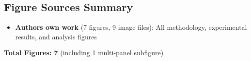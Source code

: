 \documentclass[a4paper,fleqn]{article}
\begin{document}
\subsection{Figure Sources Summary}
\begin{itemize}
    \item \textbf{Authors own work} (7 figures, 9 image files): All methodology, experimental results, and analysis figures
\end{itemize}

\textbf{Total Figures: 7} (including 1 multi-panel subfigure)
\end{document}
